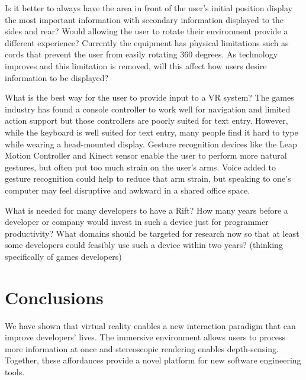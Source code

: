 \documentclass{acm_proc_article-sp}
\begin{document}
Is it better to always have the area in front of the user's initial position display the most important information with secondary information displayed to the sides and rear? Would allowing the user to rotate their environment provide a different experience?
Currently the equipment has physical limitations such as cords that prevent the user from easily rotating 360 degrees. As technology improves and this limitation is removed, will this affect how users desire information to be displayed?



What is the best way for the user to provide input to a VR system? The games industry has found a console controller to work well for navigation and limited action support but those controllers are poorly suited for text entry. However, while the keyboard is well suited for text entry, many people find it hard to type while wearing a head-mounted display. Gesture recognition devices like the Leap Motion Controller and Kinect sensor enable the user to perform more natural gestures, but often put too much strain on the user's arms. Voice added to gesture recognition could help to reduce that arm strain, but speaking to one's computer may feel disruptive and awkward in a shared office space.

What is needed for many developers to have a Rift? How many years before a developer or company would invest in such a device just for programmer productivity? What domains should be targeted for research now so that at least some developers could feasibly use such a device within two years? (thinking specifically of games developers)

\section{Conclusions}
We have shown that virtual reality enables a new interaction paradigm that can improve developers' lives. The immersive environment allows users to process more information at once and stereoscopic rendering enables depth-sensing. Together, these affordances provide a novel platform for new software engineering tools.




\end{document}
